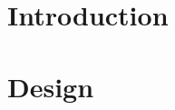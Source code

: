 \documentclass[10pt]{report}
\begin{document}

\restoregeometry

\setcounter{tocdepth}{5}

\let\LaTeXStandardClearpage\clearpage
\let\clearpage\relax %

\tableofcontents
\listoffigures
\listoftables

\let\clearpage\LaTeXStandardClearpage %

\pagebreak

\chapter{Introduction}

\pagebreak

\chapter{Design}

\pagebreak
\end{document}
